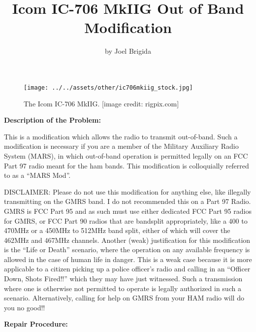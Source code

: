 \documentclass[11pt, letterpaper]{article}
\title{Icom IC-706 MkIIG Out of Band Modification}
\author{by Joel Brigida}
\date{} %
\begin{document}
\maketitle
\thispagestyle{empty} %

\hfill \break
\hfill \break
\hfill \break

\begin{figure}[H] %
    \centering %
    \texttt{[image: ../../assets/other/ic706mkiig\_stock.jpg]} %
    \caption{The Icom IC-706 MkIIG. [image credit: rigpix.com]} %
\end{figure}

\newpage
\setcounter{page}{1} %

\begin{center}
    \textbf{Description of the Problem:}
\end{center}

\hspace{\parindent}This is a modification which allows the radio to transmit out-of-band. Such a modification
is necessary if you are a member of the Military Auxiliary Radio System (MARS), in which out-of-band operation 
is permitted legally on an FCC Part 97 radio meant for the ham bands. This modification is colloquially referred to 
as a ``MARS Mod''.

\hspace{\parindent}DISCLAIMER: Please do not use this modification for anything else, like illegally transmitting 
on the GMRS band. I do not recommended this on a Part 97 Radio. GMRS is FCC Part 95 and as such must use either 
dedicated FCC Part 95 radios for GMRS, or FCC Part 90 radios that are bandsplit appropriately, like a 400 to 470MHz
or a 450MHz to 512MHz band split, either of which will cover the 462MHz and 467MHz channels. 
Another (weak) justification for this modification is the ``Life or Death'' scenario, where the operation 
on any available frequency is allowed in the case of human life in danger. This is a weak case because it is more
applicable to a citizen picking up a police officer's radio and calling in an ``Officer Down, Shots Fired!!'' which
they may have just witnessed. Such a transmission where one is otherwise not permitted to operate is legally 
authorized in such a scenario. Alternatively, calling for help on GMRS from your HAM radio will do you no good!!

\newpage
\begin{center}
    \textbf{Repair Procedure:}
\end{center}
\end{document}
